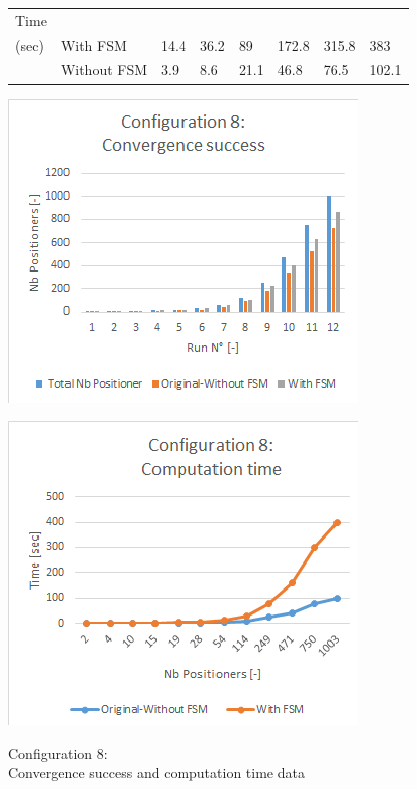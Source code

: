 \documentclass[]{spie}  %
\begin{document}
\begin{figure}[H]
\begin{minipage}{8.6cm}
{\begin{tabular}{|l|l|l|l|l|l|l|l|}
				\hline
				Time\\(sec) & With FSM  & 14.4 & 36.2  & 89 & 172.8 & 315.8 & 383 \\
				\cline{2-8}
				& Without FSM  & 3.9  & 8.6 & 21.1 & 46.8 & 76.5  & 102.1 \\
				\hline
			\end{tabular}
			}
		\label{configuration7_result} 
		\end{minipage}
		\begin{minipage}{7.5cm}
			\begin{minipage}[t]{4.2cm}
				\includegraphics[scale=0.56]{images/configuration8_conv}
				\label{configuration1_conv}
			\end{minipage}
			\begin{minipage}[t]{1.0cm}
				\includegraphics[scale=0.56]{images/configuration8_time}
				\label{configuration1_time}
			\end{minipage}
			\caption{\centering Configuration 8:\\
				Convergence success and computation time data
}
\end{minipage}
\end{figure}
\end{document}
